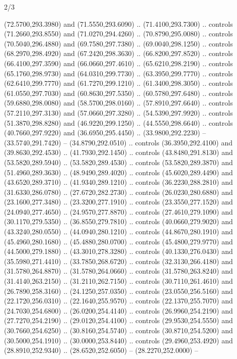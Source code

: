 \begin{flagdescription}{2/3}
\begin{scope}[xshift=0.5\flaglength,yshift=0.5\flagwidth,scale=\stretchfactor]
\begin{scope}[scale=0.001645\flagwidth,yshift=65mm,xshift=-63mm]
\begin{scope}[y=0.80pt, x=0.80pt, yscale=-1,]
\begin{scope}[cm={{1.33333,0.0,0.0,1.33333,(0.0,1e-05)}}]
  (72.5700,293.3980) and (71.5550,293.6090) .. (71.4100,293.7300) .. controls
  (71.2660,293.8550) and (71.0270,294.4260) .. (70.8790,295.0080) .. controls
  (70.5040,296.4880) and (69.7580,297.7380) .. (69.0040,298.1250) .. controls
  (68.2970,298.4920) and (67.2420,298.3630) .. (66.8200,297.8520) .. controls
  (66.4100,297.3590) and (66.0660,297.4610) .. (65.6210,298.2190) .. controls
  (65.1760,298.9730) and (64.0310,299.7730) .. (63.3950,299.7770) .. controls
  (62.6410,299.7770) and (61.7270,299.1210) .. (61.3400,298.3050) .. controls
  (61.0550,297.7030) and (60.8630,297.5350) .. (60.5780,297.6480) .. controls
  (59.6880,298.0080) and (58.5700,298.0160) .. (57.8910,297.6640) .. controls
  (57.2110,297.3130) and (57.0660,297.3280) .. (54.5390,297.9920) .. controls
  (51.3870,298.8280) and (46.9220,299.1250) .. (44.5550,298.6640) .. controls
  (40.7660,297.9220) and (36.6950,295.4450) .. (33.9800,292.2230) --
  (33.5740,291.7420) -- (34.8790,292.0510) .. controls (36.3950,292.4100) and
  (39.8630,292.4530) .. (41.7930,292.1450) .. controls (43.8480,291.8130) and
  (53.5820,289.5940) .. (53.5820,289.4530) .. controls (53.5820,289.3870) and
  (51.4960,289.3630) .. (48.9490,289.4020) .. controls (45.6020,289.4490) and
  (43.6520,289.3710) .. (41.9340,289.1210) .. controls (36.2230,288.2810) and
  (31.6330,286.0780) .. (27.6720,282.2730) .. controls (26.0230,280.6880) and
  (23.1600,277.3480) .. (23.3200,277.1910) .. controls (23.3550,277.1520) and
  (24.0940,277.4650) .. (24.9570,277.8870) .. controls (27.4610,279.1090) and
  (30.1170,279.5350) .. (36.8550,279.7810) .. controls (40.0660,279.9020) and
  (43.3240,280.0550) .. (44.0940,280.1210) .. controls (44.8670,280.1910) and
  (45.4960,280.1680) .. (45.4880,280.0700) .. controls (45.4800,279.9770) and
  (44.5000,279.1880) .. (43.3010,278.3280) .. controls (40.1330,276.0430) and
  (35.5980,271.4410) .. (33.7850,268.6720) .. controls (32.3130,266.4180) and
  (31.5780,264.8870) .. (31.5780,264.0660) .. controls (31.5780,263.8240) and
  (31.4140,263.2150) .. (31.2110,262.7150) .. controls (30.7110,261.4610) and
  (26.7890,258.3160) .. (24.1250,257.0350) .. controls (23.0550,256.5160) and
  (22.1720,256.0310) .. (22.1640,255.9570) .. controls (22.1370,255.7070) and
  (24.7030,254.6800) .. (26.0200,254.4140) .. controls (26.9960,254.2190) and
  (27.7270,254.2190) .. (29.0120,254.4100) .. controls (29.9530,254.5550) and
  (30.7660,254.6250) .. (30.8160,254.5740) .. controls (30.8710,254.5200) and
  (30.5000,254.1910) .. (30.0000,253.8440) .. controls (29.4960,253.4920) and
  (28.8910,252.9340) .. (28.6520,252.6050) -- (28.2270,252.0000) --

\end{scope}
\end{scope}
\end{scope}
\end{scope}
\end{flagdescription}
